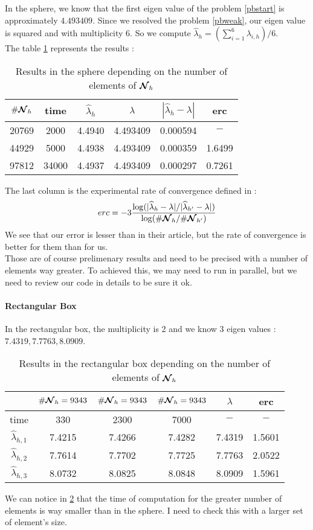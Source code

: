 In the sphere, we know that the first eigen value of the problem \ref{pbstart} is approximately $4.493409$. Since we resolved the problem \ref{pbweak}, our eigen value is squared and with multiplicity 6. So we compute $\widehat{\lambda}_h=(\sum_{i=1}^6\lambda_{i,h})/6$.\\
The table \ref{sphResults} represents the results :
\begin{table}[H]
  \centering
  \begin{tabular}{c|c|ccc|c}
    $\#{\bm{\mathcal{N}}}_h$ & time & $\widehat{\lambda}_h$ & $\lambda$ & $|\widehat{\lambda}_h-\lambda|$ & erc \\
    \hline
    20769 & 2000 & 4.4940 & 4.493409 & 0.000594 & $-$ \\
    44929 & 5000 & 4.4938 & 4.493409 & 0.000359 & 1.6499 \\
    97812 & 34000 & 4.4937 & 4.493409 & 0.000297 & 0.7261
  \end{tabular}
  \caption{Results in the sphere depending on the number of elements of ${\bm{\mathcal{N}}}_h$}
  \label{sphResults}
\end{table}

The last column is the experimental rate of convergence defined in \cite{Venegas2013} :
\[ erc=-3\frac{\log(|\widehat{\lambda}_h-\lambda|/|\widehat{\lambda}_{h'}-\lambda|)}{\log(\#{\bm{\mathcal{N}}}_h/\#{\bm{\mathcal{N}}}_{h'})} \]
We see that our error is lesser than in their article, but the rate of convergence is better for them than for us.\\

Those are of course prelimenary results and need to be precised with a number of elements way greater. To achieved this, we may need to run in parallel, but we need to review our code in details to be sure it ok.\\

\paragraph{Rectangular Box}

In the rectangular box, the multiplicity is 2 and we know 3 eigen values : $7.4319, 7.7763, 8.0909$.
\begin{table}[H]
  \centering
  \begin{tabular}{c|ccc|c|c}
    & $\#{\bm{\mathcal{N}}}_h=9343$ & $\#{\bm{\mathcal{N}}}_h=9343$ & $\#{\bm{\mathcal{N}}}_h=9343$ & $\lambda$ & erc \\
    \hline
    time & 330 & 2300 & 7000 & $-$ & $-$ \\
    $\widehat{\lambda}_{h,1}$ & 7.4215 & 7.4266 & 7.4282 & 7.4319 & 1.5601 \\
    $\widehat{\lambda}_{h,2}$ & 7.7614 & 7.7702 & 7.7725 & 7.7763 & 2.0522 \\
    $\widehat{\lambda}_{h,3}$ & 8.0732 & 8.0825 & 8.0848 & 8.0909 & 1.5961
  \end{tabular}
  \caption{Results in the rectangular box depending on the number of elements of ${\bm{\mathcal{N}}}_h$}
  \label{RBResults}
\end{table}
We can notice in \ref{RBResults} that the time of computation for the greater number of elements is way smaller than in the sphere. I need to check this with a larger set of element's size.

